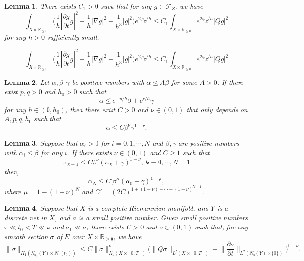 \documentclass[10pt,a4paper]{amsart}
\newtheorem{lemma}{Lemma}
\newcommand{\R}{\mathbb{R}}
\begin{document}
\begin{lemma}\label{lemma:localZ}
	There exists $C_1>0$ such that for any $g\in\mathcal F_Z$, we have
	\begin{equation} \label{eq:localZ}
		\int_{X\times\R_{\geq 0}}\Big(\frac 1 h|\frac{\partial g}{\partial t}g|^2+\frac 1 h|\nabla g|^2+\frac{1}{h^3}|g|^2 \Big)e^{2\varphi_Z/h} \leq C_1\int_{X\times\R_{\geq 0}}e^{2\varphi_Z/h}|Qg|^2
	\end{equation}
	for any $h>0$ sufficiently small.
\end{lemma}

	\begin{equation} 
		\int_{X\times\R_{\geq 0}}\Big(\frac 1 h|\frac{\partial g}{\partial t}g|^2+\frac 1 h|\nabla g|^2+\frac{1}{h^3}|g|^2 \Big)e^{2\varphi_Z/h} \leq C_1\int_{X\times\R_{\geq 0}}e^{2\varphi_Z/h}|Qg|^2
	\end{equation}

\begin{lemma}\label{lemma:interpolation}
	Let $\alpha,\beta,\gamma$ be positive numbers with $\alpha\leq A\beta$ for some $A>0$. If there exist $p,q>0$ and $h_0>0$ such that
	$$\alpha\leq e^{-p/h}\beta+e^{q/h}\gamma$$
	for any $h\in(0,h_0)$, then there exist $C>0$ and $\nu\in(0,1)$ that only depends on $A,p,q,h_0$ such that
	$$\alpha\leq C\beta^\nu\gamma^{1-\nu}.$$
\end{lemma}

\begin{lemma}\label{lemma:iteratedInterpolation}
	Suppose that  $\alpha_i>0$ for $i=0,1,\cdots,N$ and $\beta,\gamma$ are positive numbers with $\alpha_i\leq \beta$ for any $i$. If there exists $\nu\in(0,1)$ and $C\geq 1$ such that 
	$$\alpha_{k+1}\leq C\beta^\nu(\alpha_{k}+\gamma)^{1-\nu},\ k = 0, \cdots, N-1$$
	 then,
	$$\alpha_N\leq C'\beta^\mu(\alpha_{0}+\gamma)^{1-\mu},$$
	where $\mu=1-(1-\nu)^N$ and $C'=(2C)^{1+(1-\nu)+\cdots+(1-\nu)^{N-1}}$.
\end{lemma}

\begin{lemma}\label{lemma:interpolation1}
	Suppose that $X$ is a complete Riemannian manifold, and $Y$ is a discrete net in $X$, and $a$ is a small positive number. Given small positive numbers  $\tau \ll t_0<T\ll a$ and $a_1\ll a$, there exists $C>0$ and $\nu\in(0,1)$ such that,  for any smooth section $\sigma$ of $E$ over $X\times\R_{\geq 0}$, we have
		\begin{equation*}
		\|\sigma\|_{H_1(N_{a_1}(Y)\times N_\tau(t_0))}\leq C \|\sigma\|_{H_1(X\times[0,T])}^\nu\Big(\|Q\sigma\|_{L^2(X\times[0,T])}+\Big\|\frac{\partial \sigma}{\partial t}\Big\|_{L^2(N_a(Y)\times\{0\})}\Big)^{1-\nu}.
	\end{equation*}
\end{lemma}
\end{document}
